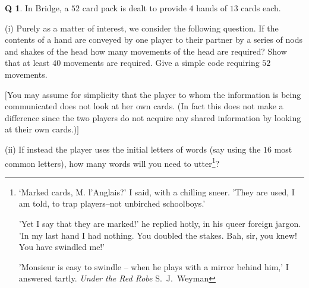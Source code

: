 \documentclass[12pt,a4paper]{article}
\theoremstyle{plain}
\theoremstyle{definition}
\newtheorem{question}[theorem]{Q}
\begin{document}
\begin{question}\label{C1.8} 
In Bridge, a $52$ card pack is dealt
to provide $4$ hands of $13$ cards each. 

(i) Purely as
a matter of interest, we consider the following question.
If the contents of a hand are conveyed by one player 
to their partner by a series of nods and shakes of the head
how many movements of the head are required?
Show that at least $40$ movements are required.
Give a simple code requiring $52$ movements.

$[$You may assume for simplicity that the player to
whom the information is being communicated does not
look at her own cards. (In fact this does not make
a difference since the two players do not acquire
any shared information by looking at their
own cards.)$]$



(ii) If instead the player uses the initial letters
of words (say using the $16$ most common letters),
how many words will you 
need to utter\footnote{`Marked cards, M. l'Anglais?' I said, 
with a chilling sneer. 'They are used, I am told, 
to trap players--not unbirched schoolboys.'

'Yet I say that they are marked!' 
he replied hotly, in his queer foreign jargon. 
'In my last hand I had nothing. You doubled the stakes. 
Bah, sir, you knew! You have swindled me!'

'Monsieur is easy to swindle
-- when he plays with a mirror behind him,' 
I answered tartly. \emph{Under the Red Robe} S.~J.~Weyman}?
\end{question}
\end{document}

